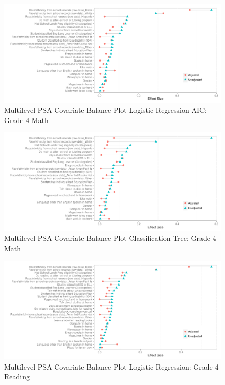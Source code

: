 \documentclass[letterpaper,12p,twoside]{article} %
\begin{document}
\begin{figure}[h!]
\begin{center}
\includegraphics[width=\textwidth]{../Figures2009/g4math-mlpsa-lrAIC-balance.pdf}
\caption{Multilevel PSA Covariate Balance Plot Logistic Regression AIC: Grade 4 Math}
\end{center}
\end{figure}

\begin{figure}[h!]
\begin{center}
\includegraphics[width=\textwidth]{../Figures2009/g4math-mlpsa-ctree-balance.pdf}
\caption{Multilevel PSA Covariate Balance Plot Classification Tree: Grade 4 Math}
\end{center}
\end{figure}

\begin{figure}[h!]
\begin{center}
\includegraphics[width=\textwidth]{../Figures2009/g4read-mlpsa-lr-balance.pdf}
\caption{Multilevel PSA Covariate Balance Plot Logistic Regression: Grade 4 Reading}
\end{center}
\end{figure}
\end{document}
